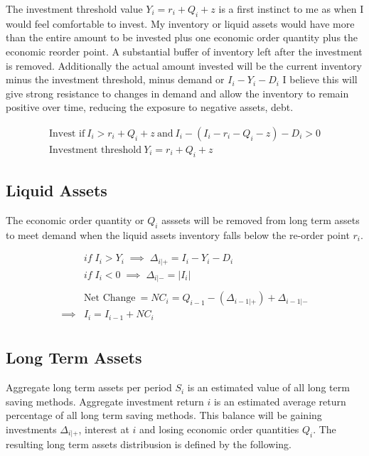 \documentclass{article}
\begin{document}
The investment threshold value  $Y_{i} =  r_{i} + Q_{i} + z$  is a first instinct to me as when I would feel comfortable to invest. My inventory or liquid assets would have more than the entire amount to be invested plus one economic order quantity plus the economic reorder point. A substantial buffer of inventory left after the investment is removed. Additionally the actual amount invested will be the current inventory minus the investment threshold, minus demand or $I_{i} - Y_{i} - D_{i}$  I believe this will give strong resistance to changes in demand and allow the inventory to remain positive over time, reducing the exposure to negative assets, debt. 

\begin{equation}
	\begin{split}
		\text{Invest if} \: I_{i} > r_{i} + Q_{i} + z \:\text{and} \: I_{i} - ( I_{i} - r_{i} - Q_{i} - z) - D_{i} > 0 \\
		\text{Investment threshold} \: Y_{i} =  r_{i} + Q_{i} + z 
	\end{split}
\end{equation}

\subsection{Liquid Assets}
The economic order quantity or $Q_{i}$  asssets will be removed from long term assets to meet demand when the liquid assets inventory falls below the re-order point $r_{i}$.

\begin{align*}
	& if \; I_{i} > Y_{i} \;\implies\;	 \Delta_{i|+} = I_{i} - Y_{i} - D_{i}\\
	& if \; I_{i} < 0 \;\implies\; 	 \Delta_{i|-} = |I_{i}|\\ 
	\\
	& \text{Net Change} \: = NC_{i}= Q_{i-1} -( \Delta_{i-1|+})+\Delta_{i-1|-}\\
										\implies & I_{i} = I_{i-1} + NC_{i}\\
\end{align*}

\subsection{Long Term Assets}
Aggregate long term assets per period $S_{i}$ is an estimated value of all long term saving methods. Aggregate investment return $i$ is an estimated average return percentage of all long term saving methods.  This balance will be gaining investments $\Delta_{i|+}$, interest at $i$ and losing economic order quantities $Q_{i}$. The resulting long term assets distribusion is defined by the following. 
\end{document}
